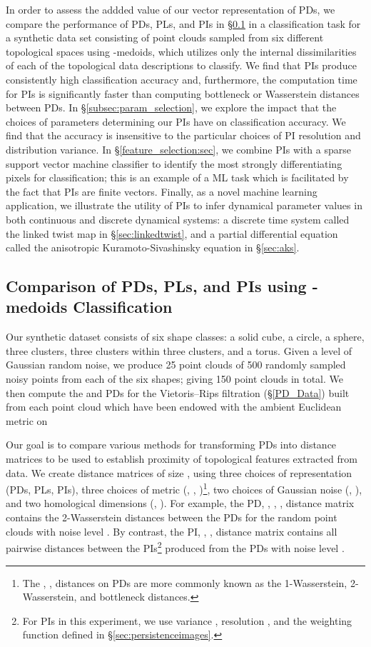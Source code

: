 \documentclass[11pt]{article}
\begin{document}
In order to assess the addded value of our vector representation of PDs, we compare the performance of PDs, PLs, and PIs in \S\ref{sec:kmedoids} in a classification task for a synthetic data set consisting of point clouds sampled from six different topological spaces using -medoids, which utilizes only the internal dissimilarities of each of the topological data descriptions to classify. We find that PIs produce consistently high classification accuracy and, furthermore, the computation time for PIs is significantly faster than computing bottleneck or Wasserstein distances between PDs. In \S \ref{subsec:param_selection}, we explore the impact that the choices of parameters determining our PIs have on classification accuracy.  We find that the accuracy is insensitive to the particular choices of PI resolution and distribution variance. In \S\ref{feature_selection:sec}, we combine PIs with a sparse support vector machine classifier to identify the most strongly differentiating pixels for classification; this is an example of a ML task which is facilitated by the fact that PIs are finite vectors. Finally, as a novel machine learning application, we illustrate the utility of PIs to infer dynamical parameter values in both continuous and discrete dynamical systems: a discrete time system called the linked twist map in \S \ref{sec:linkedtwist}, and a partial differential equation called the anisotropic Kuramoto-Sivashinsky equation in \S \ref{sec:aks}. 

\subsection{Comparison of PDs, PLs, and PIs using -medoids Classification}
\label{sec:kmedoids}

Our synthetic dataset consists of six shape classes: a solid cube, a circle, a sphere, three clusters, three clusters within three clusters, and a torus. Given a level of Gaussian random noise, we produce 25 point clouds of 500 randomly sampled noisy points from each of the six shapes; giving 150 point clouds in total. We then compute the  and  PDs for the Vietoris--Rips filtration (\S\ref{PD_Data}) built from each point cloud which have been endowed with the ambient Euclidean metric on 

Our goal is to compare various methods for transforming PDs into distance matrices to be used to establish proximity of topological features extracted from data.  We create  distance matrices of size , using three choices of representation (PDs, PLs, PIs), three choices of metric (, , )\footnote{The , ,  distances on PDs are more commonly known as the 1-Wasserstein, 2-Wasserstein, and bottleneck distances.}, two choices of Gaussian noise (, ), and two homological dimensions (, ). For example, the PD, , , ,  distance matrix contains the 2-Wasserstein distances between the  PDs for the random point clouds with noise level . By contrast, the PI, , ,  distance matrix contains all pairwise  distances between the PIs\footnote{For PIs in this experiment, we use variance , resolution , and the weighting function defined in \S\ref{sec:persistenceimages}.} produced from the  PDs with noise level .
\end{document}
